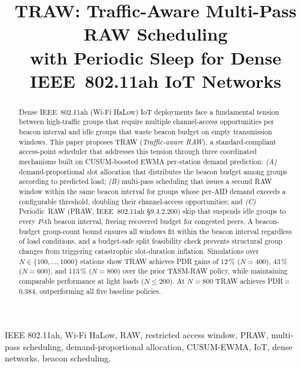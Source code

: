 \documentclass[conference]{IEEEtran}
\begin{document}
\title{TRAW: Traffic-Aware Multi-Pass RAW Scheduling\\
with Periodic Sleep for Dense IEEE~802.11ah IoT Networks}

\author{
}

\maketitle

\begin{abstract}
Dense IEEE~802.11ah (Wi-Fi HaLow) IoT deployments face a fundamental
tension between high-traffic groups that require multiple channel-access
opportunities per beacon interval and idle groups that waste beacon
budget on empty transmission windows.
This paper proposes TRAW (\emph{Traffic-aware RAW}), a standard-compliant
access-point scheduler that addresses this tension through three
coordinated mechanisms built on CUSUM-boosted EWMA per-station demand
prediction: \emph{(A)} demand-proportional slot allocation that
distributes the beacon budget among groups according to predicted load;
\emph{(B)} multi-pass scheduling that issues a second RAW window within
the same beacon interval for groups whose per-AID demand exceeds a
configurable threshold, doubling their channel-access opportunities; and
\emph{(C)} Periodic~RAW (PRAW, IEEE~802.11ah \S9.4.2.200) skip that
suspends idle groups to every $P$-th beacon interval, freeing recovered
budget for congested peers.
A beacon-budget group-count bound ensures all windows fit within the
beacon interval regardless of load conditions, and a budget-safe split
feasibility check prevents structural group changes from triggering
catastrophic slot-duration inflation.
Simulations over $N\!\in\!\{100,\ldots,1000\}$ stations show TRAW
achieves PDR gains of 12\,\% ($N\!=\!400$), 43\,\% ($N\!=\!600$),
and 113\,\% ($N\!=\!800$) over the prior TASM-RAW policy, while
maintaining comparable performance at light loads ($N\!\leq\!200$).
At $N\!=\!800$ TRAW achieves PDR\,=\,0.384, outperforming all five
baseline policies.
\end{abstract}

\begin{IEEEkeywords}
IEEE 802.11ah, Wi-Fi HaLow, RAW, restricted access window, PRAW,
multi-pass scheduling, demand-proportional allocation, CUSUM-EWMA,
IoT, dense networks, beacon scheduling.
\end{IEEEkeywords}
\end{document}

